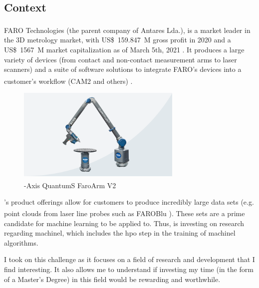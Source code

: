 
\subsection{Context}

FARO Technologies\textsuperscript{\textregistered} (the parent company of Antares Lda.), is a market leader in the 3D metrology market, with \SI{159.847}[US\$]{M} gross profit in 2020 \parencite{faro_2021_financial_results} and a \SI{1567}[US\$]{M} market capitalization as of March 5th, 2021 \parencite{faro_stock_info}. It produces a large variety of devices (from contact and non-contact measurement arms to laser scanners) and a suite of software solutions to integrate FARO's devices into a customer's workflow (CAM2\textsuperscript{\textregistered} and others) \parencite{faro_homepage}.

\begin{figure}[ht]
\centering
\includegraphics[width=0.7\textwidth]{images/faro_quantum_s_arm.png}
\caption{-Axis QuantumS FaroArm\textsuperscript{\textregistered} V2}
\end{figure}
 
\faro's product offerings allow for customers to produce incredibly large data sets (e.g. point clouds from laser line probes such as FAROBlu\textsuperscript{\textregistered} \parencite{faro_quantums}). These sets are a prime candidate for machine learning to be applied to. Thus, \faro is investing on research regarding \acrfull{machinel}, which includes the \acrfull{hpo} step in the training of \acrshort{machinel} algorithms.

I took on this challenge as it focuses on a field of research and development that I find interesting. It also allows me to understand if investing my time (in the form of a Master's Degree) in this field would be rewarding and worthwhile.